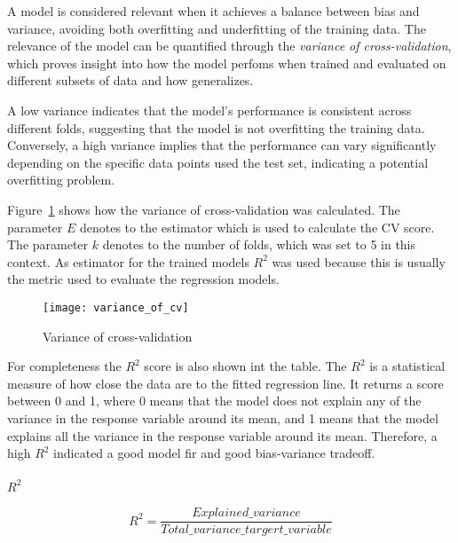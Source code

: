 A model is considered relevant when it achieves a balance between bias and
variance, avoiding
both overfitting and underfitting of the training data.
The relevance of the model can be quantified through the \textit{variance of
cross-validation},
which proves insight into how the model perfoms when trained and evaluated on
different subsets
of data and how generalizes.

A low variance indicates that the model's performance is consistent across
different folds,
suggesting that the model is not overfitting the training data.
Conversely, a high variance implies that the performance can vary
significantly depending on the
specific data points used the test set, indicating a potential overfitting
problem.

Figure~\ref{fig:variance-of-cv} shows how the variance of cross-validation
was calculated.
The parameter $E$ denotes to the estimator which is used to calculate the
\ac{CV} score.
The parameter $k$ denotes to the number of folds, which was set to 5 in this
context.
As estimator for the trained models $R^2$ was used because this is usually
the metric used to
evaluate the regression models.

\begin{figure}[h]
    \begin{tcolorbox}[arc=0pt,boxrule=0.5pt]
        \centering
        \texttt{[image: variance\_of\_cv]}
        \caption{Variance of cross-validation}
        \label{fig:variance-of-cv}
    \end{tcolorbox}
\end{figure}

For completeness the $R^2$ score is also shown int the table.
The $R^2$ is a statistical measure of how close the data are to the fitted
regression line.
It returns a score between 0 and 1, where 0 means that the model does not
explain any of the
variance in the response variable around its mean, and 1 means that the model
explains all the
variance in the response variable around its mean.
Therefore, a high $R^2$ indicated a good model fir and good bias-variance
tradeoff.
\cite[p. 43]{muller_introductionmachinelearning_2016}

\paragraph*{$R^2$}

\begin{equation}
    \label{eq:r2}
    R^2 = \frac{Explained\_variance}{Total\_variance\_targert\_variable}
\end{equation}

